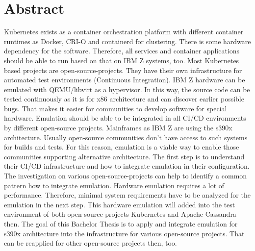 \section*{Abstract}
\label{sec:abstract}
Kubernetes exists as a container orchestration platform with different container runtimes as Docker, CRI-O and containerd for clustering. There is some hardware dependency for the software. Therefore, all services and container applications should be able to run based on that on IBM Z systems, too. Most Kubernetes based projects are open-source-projects. They have their own infrastructure for automated test environments (Continuous Integration). IBM Z hardware can be emulated with QEMU/libvirt as a hypervisor. In this way, the source code can be tested continuously as it is for x86 architecture and can discover earlier possible bugs. That makes it easier for communities to develop software for special hardware. Emulation should be able to be integrated in all CI/CD environments by different open-source projects. Mainframes as IBM Z are using the s390x architecture. Usually open-source communities don't have access to such systems for builds and tests. For this reason, emulation is a viable way to enable those communities supporting alternative architecture.
The first step is to understand their CI/CD infrastructure and how to integrate emulation in their
configuration. The investigation on various open-source-projects can help to identify a common pattern how to integrate emulation. Hardware emulation requires a lot of performance. Therefore, minimal system requirements have to be analyzed for the emulation in the next step. This hardware emulation will added into the test environment of both open-source projects Kubernetes and Apache Cassandra then. The goal of this Bachelor Thesis is to apply and integrate emulation for s390x architecture into the infrastructure for various open-source projects. That can be reapplied for other open-source projects then, too. 

